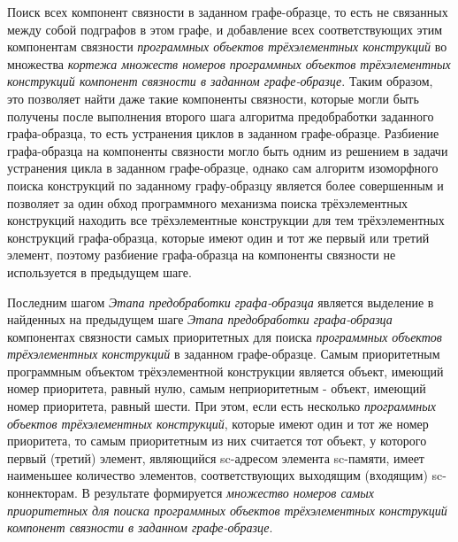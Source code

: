 \begin{textitemize}
	\item Поиск всех компонент связности в заданном графе-образце, то есть не связанных между собой подграфов в этом графе, и добавление всех соответствующих этим компонентам связности \textit{программных объектов трёхэлементных конструкций} во множества \textit{кортежа множеств номеров программных объектов трёхэлементных конструкций компонент связности в заданном графе-образце}. Таким образом, это позволяет найти даже такие компоненты связности, которые могли быть получены после выполнения второго шага алгоритма предобработки заданного графа-образца, то есть устранения циклов в заданном графе-образце. Разбиение графа-образца на компоненты связности могло быть одним из решением в задачи устранения цикла в заданном графе-образце, однако сам алгоритм изоморфного поиска конструкций по заданному графу-образцу является более совершенным и позволяет за один обход программного механизма поиска трёхэлементных конструкций находить все трёхэлементные конструкции для тем трёхэлементных конструкций графа-образца, которые имеют один и тот же первый или третий элемент, поэтому разбиение графа-образца на компоненты связности не используется в предыдущем шаге.
	\item Последним шагом \textit{Этапа предобработки графа-образца} является выделение в найденных на предыдущем шаге \textit{Этапа предобработки графа-образца} компонентах связности самых приоритетных для поиска \textit{программных объектов трёхэлементных конструкций} в заданном графе-образце. Самым приоритетным программным объектом трёхэлементной конструкции является объект, имеющий номер приоритета, равный нулю, самым неприоритетным - объект, имеющий номер приоритета, равный шести. При этом, если есть несколько \textit{программных объектов трёхэлементных конструкций}, которые имеют один и тот же номер приоритета, то самым приоритетным из них считается тот объект, у которого первый (третий) элемент, являющийся sc-адресом элемента sc-памяти, имеет наименьшее количество элементов, соответствующих выходящим (входящим) sc-коннекторам. В результате формируется \textit{множество номеров самых приоритетных для поиска программных объектов трёхэлементных конструкций компонент связности в заданном графе-образце}.
\end{textitemize}

